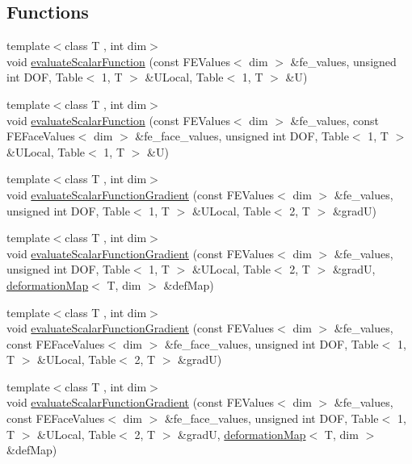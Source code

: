 \subsection*{Functions}
\begin{DoxyCompactItemize}
\item 
{\footnotesize template$<$class T , int dim$>$ }\\void \mbox{\hyperlink{group___evaluation_functions_ga399ae2353249293211c021848a64175c}{evaluate\+Scalar\+Function}} (const F\+E\+Values$<$ dim $>$ \&fe\+\_\+values, unsigned int D\+OF, Table$<$ 1, T $>$ \&U\+Local, Table$<$ 1, T $>$ \&U)
\item 
{\footnotesize template$<$class T , int dim$>$ }\\void \mbox{\hyperlink{group___evaluation_functions_ga2e2fbeb2173113c6889c73bbb7304789}{evaluate\+Scalar\+Function}} (const F\+E\+Values$<$ dim $>$ \&fe\+\_\+values, const F\+E\+Face\+Values$<$ dim $>$ \&fe\+\_\+face\+\_\+values, unsigned int D\+OF, Table$<$ 1, T $>$ \&U\+Local, Table$<$ 1, T $>$ \&U)
\item 
{\footnotesize template$<$class T , int dim$>$ }\\void \mbox{\hyperlink{group___evaluation_functions_ga3ee6127c2c5c8333bb7fb384dcdb431f}{evaluate\+Scalar\+Function\+Gradient}} (const F\+E\+Values$<$ dim $>$ \&fe\+\_\+values, unsigned int D\+OF, Table$<$ 1, T $>$ \&U\+Local, Table$<$ 2, T $>$ \&gradU)
\item 
{\footnotesize template$<$class T , int dim$>$ }\\void \mbox{\hyperlink{group___evaluation_functions_gabeb71201e8213a7c7616cd8824617f73}{evaluate\+Scalar\+Function\+Gradient}} (const F\+E\+Values$<$ dim $>$ \&fe\+\_\+values, unsigned int D\+OF, Table$<$ 1, T $>$ \&U\+Local, Table$<$ 2, T $>$ \&gradU, \mbox{\hyperlink{structdeformation_map}{deformation\+Map}}$<$ T, dim $>$ \&def\+Map)
\item 
{\footnotesize template$<$class T , int dim$>$ }\\void \mbox{\hyperlink{group___evaluation_functions_ga4622566d0fe19b017cf8d2643ffeb47a}{evaluate\+Scalar\+Function\+Gradient}} (const F\+E\+Values$<$ dim $>$ \&fe\+\_\+values, const F\+E\+Face\+Values$<$ dim $>$ \&fe\+\_\+face\+\_\+values, unsigned int D\+OF, Table$<$ 1, T $>$ \&U\+Local, Table$<$ 2, T $>$ \&gradU)
\item 
{\footnotesize template$<$class T , int dim$>$ }\\void \mbox{\hyperlink{group___evaluation_functions_gabedd4ae2841d2332ed0df0513b189e34}{evaluate\+Scalar\+Function\+Gradient}} (const F\+E\+Values$<$ dim $>$ \&fe\+\_\+values, const F\+E\+Face\+Values$<$ dim $>$ \&fe\+\_\+face\+\_\+values, unsigned int D\+OF, Table$<$ 1, T $>$ \&U\+Local, Table$<$ 2, T $>$ \&gradU, \mbox{\hyperlink{structdeformation_map}{deformation\+Map}}$<$ T, dim $>$ \&def\+Map)

\end{DoxyCompactItemize}
